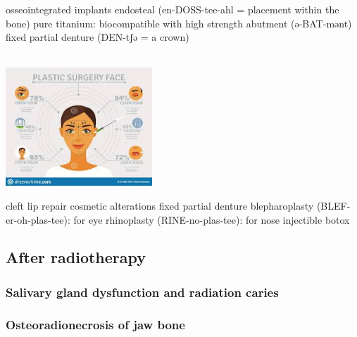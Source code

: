 \documentclass[
paper=landscape,
paper=160mm:90mm, %
fontsize=11pt, %
pagesize, %
parskip=half-, %
]{scrartcl} %
\newenvironment{WrapText1}[3][r]
{\wrapfigure[#2]{#1}{#3}}
{\endwrapfigure}
\newcommand{\wrapr}[6]{
\begin{minipage}{\linewidth}\mbox{}\\
\vspace{#1}
\begin{WrapText1}{#2}{#3}
\vspace{#4}#5\end{WrapText1}#6
\end{minipage}}
\theoremstyle{mythmstyle} %
\newcommand{\comm}[1]{} %
\begin{document}
{{\begin{outline}
\1 osseointegrated implants
    \2 endosteal (en-DOSS-tee-ahl = placement within the bone)
    \2 pure titanium: biocompatible with high strength
    \2 abutment (ə-BAT-mənt)
    \2 fixed partial denture (DEN-tʃə = a crown)
\end{outline}
} %

\clearpage


\wrapr{-8mm}{7}{6cm}{-1mm}
{%
\includegraphics[width=5.5cm]{plastic_face.jpeg}
} %
{%
\begin{outline}

\1 cleft lip repair
\1 cosmetic alterations
    \2 fixed partial denture
    \2 blepharoplasty (BLEF-er-oh-plas-tee): for eye
    \2 rhinoplasty (RINE-no-plas-tee): for nose
    \2 injectible botox
\end{outline}
} %
\clearpage

%
} %




\subsection{After radiotherapy} 

\subsubsection{Salivary gland dysfunction and radiation caries}

\subsubsection{Osteoradionecrosis of jaw bone}
\end{document}
